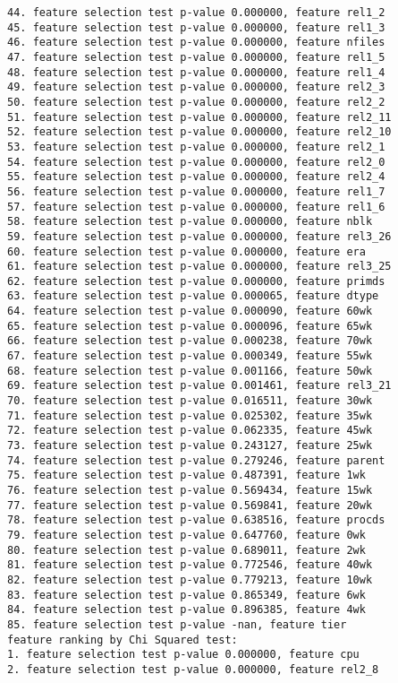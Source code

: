 \begin{verbatim}
44. feature selection test p-value 0.000000, feature rel1_2
45. feature selection test p-value 0.000000, feature rel1_3
46. feature selection test p-value 0.000000, feature nfiles
47. feature selection test p-value 0.000000, feature rel1_5
48. feature selection test p-value 0.000000, feature rel1_4
49. feature selection test p-value 0.000000, feature rel2_3
50. feature selection test p-value 0.000000, feature rel2_2
51. feature selection test p-value 0.000000, feature rel2_11
52. feature selection test p-value 0.000000, feature rel2_10
53. feature selection test p-value 0.000000, feature rel2_1
54. feature selection test p-value 0.000000, feature rel2_0
55. feature selection test p-value 0.000000, feature rel2_4
56. feature selection test p-value 0.000000, feature rel1_7
57. feature selection test p-value 0.000000, feature rel1_6
58. feature selection test p-value 0.000000, feature nblk
59. feature selection test p-value 0.000000, feature rel3_26
60. feature selection test p-value 0.000000, feature era
61. feature selection test p-value 0.000000, feature rel3_25
62. feature selection test p-value 0.000000, feature primds
63. feature selection test p-value 0.000065, feature dtype
64. feature selection test p-value 0.000090, feature 60wk
65. feature selection test p-value 0.000096, feature 65wk
66. feature selection test p-value 0.000238, feature 70wk
67. feature selection test p-value 0.000349, feature 55wk
68. feature selection test p-value 0.001166, feature 50wk
69. feature selection test p-value 0.001461, feature rel3_21
70. feature selection test p-value 0.016511, feature 30wk
71. feature selection test p-value 0.025302, feature 35wk
72. feature selection test p-value 0.062335, feature 45wk
73. feature selection test p-value 0.243127, feature 25wk
74. feature selection test p-value 0.279246, feature parent
75. feature selection test p-value 0.487391, feature 1wk
76. feature selection test p-value 0.569434, feature 15wk
77. feature selection test p-value 0.569841, feature 20wk
78. feature selection test p-value 0.638516, feature procds
79. feature selection test p-value 0.647760, feature 0wk
80. feature selection test p-value 0.689011, feature 2wk
81. feature selection test p-value 0.772546, feature 40wk
82. feature selection test p-value 0.779213, feature 10wk
83. feature selection test p-value 0.865349, feature 6wk
84. feature selection test p-value 0.896385, feature 4wk
85. feature selection test p-value -nan, feature tier
feature ranking by Chi Squared test:
1. feature selection test p-value 0.000000, feature cpu
2. feature selection test p-value 0.000000, feature rel2_8

\end{verbatim}
